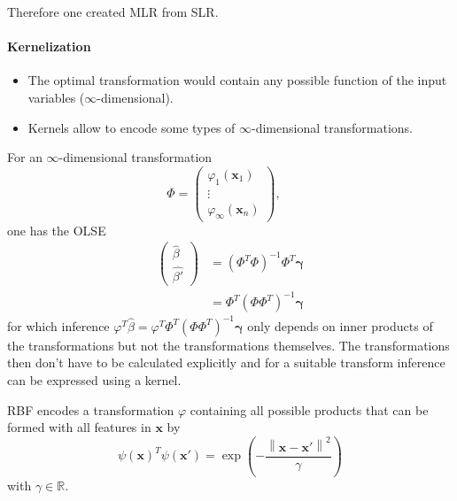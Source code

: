 Therefore one created MLR from SLR.

\paragraph{Kernelization}
\begin{itemize}
    \item The optimal transformation would contain any possible function of the input variables ($\infty$-dimensional).
    \item Kernels allow to encode some types of $\infty$-dimensional transformations.
\end{itemize}


For an $\infty$-dimensional transformation
\begin{equation*}
    \Phi =
    \begin{pmatrix}
        \varphi_1(\mathbf{x}_1) \\
        \vdots                  \\
        \varphi_\infty(\mathbf{x}_n)
    \end{pmatrix},\quad
\end{equation*}
one has the OLSE
\begin{align*}
    \begin{pmatrix}
        \hat{\beta} \\
        \widehat{\beta'}
    \end{pmatrix} & ={(\Phi^T \Phi)}^{-1}\Phi^T\boldsymbol{\gamma}    \\
                     & =\Phi^T{(\Phi \Phi^T)}^{-1}\boldsymbol{\gamma}
\end{align*}
for which inference $\varphi^T \hat{\beta} = \varphi^T \Phi^T{(\Phi \Phi^T)}^{-1}\boldsymbol{\gamma}$ only depends on inner products of the transformations but not the transformations themselves. The transformations then don't have to be calculated explicitly and for a suitable transform inference can be expressed using a kernel.

RBF encodes a transformation $\varphi$ containing all possible products that can be formed with all features in $\mathbf{x}$ by
\begin{equation*}
    {\psi(\mathbf{x})}^T\psi(\mathbf{x}')=\exp\left(-\frac{\left\|\mathbf{x}-\mathbf{x}'\right\|^{2}}{\gamma}\right)
\end{equation*}
with $\gamma \in \mathbb{R}$.


